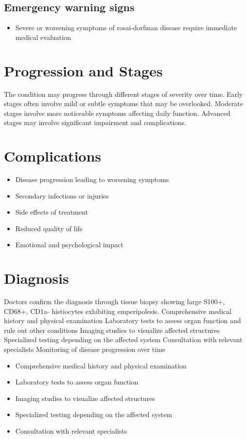 \subsection{Emergency warning signs}
\begin{itemize}[noitemsep]
  \item Severe or worsening symptoms of rosai-dorfman disease require immediate medical evaluation
\end{itemize}
\section{Progression and Stages}
The condition may progress through different stages of severity over time. Early stages often involve mild or subtle symptoms that may be overlooked. Moderate stages involve more noticeable symptoms affecting daily function. Advanced stages may involve significant impairment and complications.
\section{Complications}
\begin{itemize}[noitemsep]
  \item Disease progression leading to worsening symptoms
  \item Secondary infections or injuries
  \item Side effects of treatment
  \item Reduced quality of life
  \item Emotional and psychological impact
\end{itemize}
\section{Diagnosis}
Doctors confirm the diagnosis through tissue biopsy showing large S100+, CD68+, CD1a- histiocytes exhibiting emperipolesis. Comprehensive medical history and physical examination Laboratory tests to assess organ function and rule out other conditions Imaging studies to visualize affected structures Specialized testing depending on the affected system Consultation with relevant specialists Monitoring of disease progression over time

\begin{itemize}[noitemsep]
  \item Comprehensive medical history and physical examination
  \item Laboratory tests to assess organ function
  \item Imaging studies to visualize affected structures
  \item Specialized testing depending on the affected system
  \item Consultation with relevant specialists
\end{itemize}
